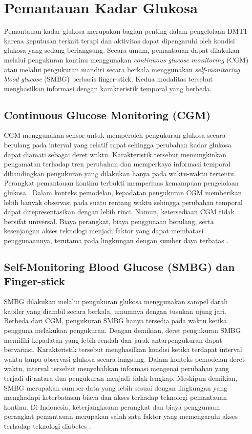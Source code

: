\section{Pemantauan Kadar Glukosa}
\label{sec:bab2-pemantauan-glukosa}

Pemantauan kadar glukosa merupakan bagian penting dalam pengelolaan DMT1 karena keputusan terkait terapi dan aktivitas dapat dipengaruhi oleh kondisi glukosa yang sedang 
berlangsung. Secara umum, pemantauan dapat dilakukan melalui pengukuran kontinu menggunakan \textit{continuous glucose monitoring} (CGM) atau melalui pengukuran mandiri secara
berkala menggunakan \textit{self-monitoring blood glucose} (SMBG) berbasis finger-stick. Kedua modalitas tersebut menghasilkan informasi dengan karakteristik temporal
yang berbeda.

\subsection{Continuous Glucose Monitoring (CGM)}
\label{subsec:bab2-cgm}

CGM menggunakan sensor untuk memperoleh pengukuran glukosa secara berulang pada interval yang relatif rapat sehingga perubahan kadar glukosa dapat diamati sebagai deret waktu. 
Karakteristik tersebut memungkinkan pengamatan terhadap tren perubahan dan memperkaya informasi temporal dibandingkan pengukuran yang dilakukan hanya pada waktu-waktu tertentu. 
Perangkat pemantauan kontinu terbukti memperluas kemampuan pengelolaan glukosa \parencite{samajdar2025}.
Dalam konteks pemodelan, kepadatan pengukuran CGM memberikan lebih banyak observasi pada suatu rentang waktu sehingga perubahan temporal dapat direpresentasikan dengan lebih 
rinci. Namun, ketersediaan CGM tidak bersifat universal. Biaya perangkat, biaya penggunaan berulang, serta kesenjangan akses teknologi menjadi faktor yang dapat membatasi 
penggunaannya, terutama pada lingkungan dengan sumber daya terbatas \parencite{santoscastro2025}.

\subsection{Self-Monitoring Blood Glucose (SMBG) dan Finger-stick}
\label{subsec:bab2-smbg}

SMBG dilakukan melalui pengukuran glukosa menggunakan sampel darah kapiler yang diambil secara berkala, umumnya dengan tusukan ujung jari. Berbeda dari CGM, pengukuran SMBG 
hanya tersedia pada waktu ketika pengguna melakukan pengukuran. Dengan demikian, deret pengukuran SMBG memiliki kepadatan yang lebih rendah dan jarak antarpengukuran dapat 
bervariasi. Karakteristik tersebut menghasilkan kondisi ketika terdapat interval waktu tanpa observasi glukosa secara langsung. Dalam konteks pemodelan deret waktu, interval 
tersebut menyebabkan informasi mengenai perubahan yang terjadi di antara dua pengukuran menjadi tidak lengkap. Meskipun demikian, SMBG merupakan sumber data yang lebih sesuai
dengan lingkungan yang menghadapi keterbatasan biaya dan akses terhadap teknologi pemantauan kontinu. Di Indonesia, keterjangkauan perangkat dan biaya penggunaan 
perangkat pemantauan merupakan salah satu faktor yang memengaruhi akses terhadap teknologi diabetes \parencite{ramadaniati2024}.

